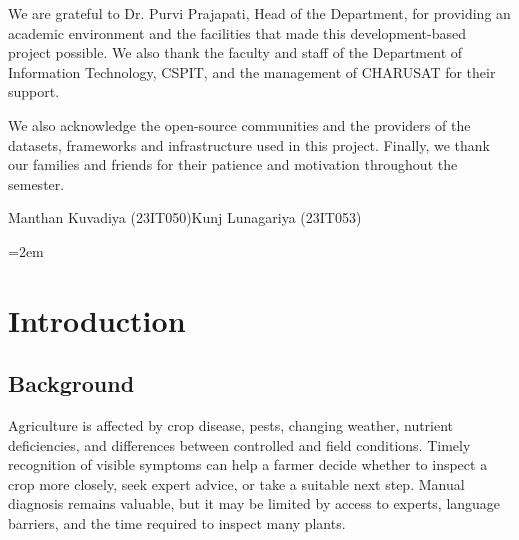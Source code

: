 \documentclass[12pt,a4paper,oneside,openany]{report}
\begin{document}
We are grateful to Dr. Purvi Prajapati, Head of the Department, for providing an academic environment and the facilities that made this development-based project possible. We also thank the faculty and staff of the Department of Information Technology, CSPIT, and the management of CHARUSAT for their support.

We also acknowledge the open-source communities and the providers of the datasets, frameworks and infrastructure used in this project. Finally, we thank our families and friends for their patience and motivation throughout the semester.

\vspace{0.35cm}
Manthan Kuvadiya (23IT050)\hfill Kunj Lunagariya (23IT053)

\clearpage
{}
\begingroup
\small
\linespread{1.0}\selectfont
\setlength{\parskip}{0pt}

\setlength{\cftbeforechapskip}{4pt}
\setlength{\cftbeforesecskip}{1.5pt}
\setlength{\cftbeforesubsecskip}{0.8pt}
\setlength{\cftsecindent}{1.0em}
\setlength{\cftsubsecindent}{2.0em}
\setlength{\cftchapnumwidth}{2.6em}
\setlength{\cftsecnumwidth}{3.5em}
\setlength{\cftsubsecnumwidth}{4.2em}
\cftsetpnumwidth{2.2em}
\cftsetrmarg{3.0em}
\sloppy
\emergencystretch=2em
\tableofcontents
\endgroup

\clearpage
{}
{}
\begingroup
\small
\linespread{1.0}\selectfont
\setlength{\parskip}{0pt}
\listoffigures
\endgroup

\clearpage
{}
{}
\begingroup
\small
\linespread{1.0}\selectfont
\setlength{\parskip}{0pt}
\listoftables
\endgroup

\clearpage
{}
\setcounter{page}{1}

\chapter{Introduction}
\section{Background}
Agriculture is affected by crop disease, pests, changing weather, nutrient deficiencies, and differences between controlled and field conditions. Timely recognition of visible symptoms can help a farmer decide whether to inspect a crop more closely, seek expert advice, or take a suitable next step. Manual diagnosis remains valuable, but it may be limited by access to experts, language barriers, and the time required to inspect many plants.
\end{document}
